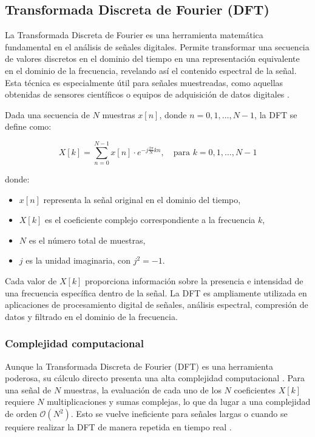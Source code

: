 \documentclass[letterpaper,11pt]{article}
\begin{document}
        \subsection{Transformada Discreta de Fourier (DFT)}
            La Transformada Discreta de Fourier es una herramienta matemática fundamental en el análisis de señales digitales. Permite transformar una secuencia de valores discretos en el dominio del tiempo en una representación equivalente en el dominio de la frecuencia, revelando así el contenido espectral de la señal. Esta técnica es especialmente útil para señales muestreadas, como aquellas obtenidas de sensores científicos o equipos de adquisición de datos digitales \cite{Mc2000}.


            Dada una secuencia de \( N \) muestras \( x[n] \), donde \( n = 0, 1, \dots, N-1 \), la DFT se define como:

\begin{equation}
X[k] = \sum_{n=0}^{N-1} x[n] \cdot e^{-j \frac{2\pi}{N}kn}, \quad \text{para } k = 0, 1, \dots, N-1
\end{equation}

donde:
\begin{itemize}
    \item \( x [ n] \) representa la señal original en el dominio del tiempo,
    \item \( X [ k] \) es el coeficiente complejo correspondiente a la frecuencia \( k \),
    \item \( N \) es el número total de muestras,
    \item \( j \) es la unidad imaginaria, con \( j^2 = -1 \).
\end{itemize}

\vspace{0.2cm}
Cada valor de \( X[k] \) proporciona información sobre la presencia e intensidad de una frecuencia específica dentro de la señal. La DFT es ampliamente utilizada en aplicaciones de procesamiento digital de señales, análisis espectral, compresión de datos y filtrado en el dominio de la frecuencia.

\subsubsection{Complejidad computacional}
Aunque la Transformada Discreta de Fourier (DFT) es una herramienta poderosa, su cálculo directo presenta una alta complejidad computacional . Para una señal de \( N \) muestras, la evaluación de cada uno de los \( N \) coeficientes \( X[k] \) requiere \( N \) multiplicaciones y sumas complejas, lo que da lugar a una complejidad de orden \( \mathcal{O}(N^2) \). Esto se vuelve ineficiente para señales largas o cuando se requiere realizar la DFT de manera repetida en tiempo real \cite{oppenheim2010}.
\end{document}
